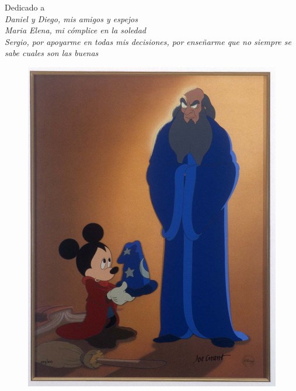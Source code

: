 \thispagestyle{empty}
{}

\vspace*{2cm}


\begin{center}
    Dedicado a \\ \medskip
    {\it
        Daniel y Diego, mis amigos y espejos \\ \smallskip
        Maria Elena, mi cómplice en la soledad \\ \smallskip
        Sergio, por apoyarme en todas mis decisiones, por enseñarme que no siempre se sabe cuales son las buenas \\ \smallskip
    }

\end{center}

\vspace*{1cm}

\begin{center}
    \begin{figure}[h!]
        \includegraphics[width=1.0\textwidth]{fantasia}
    \end{figure}
\end{center}
\null

